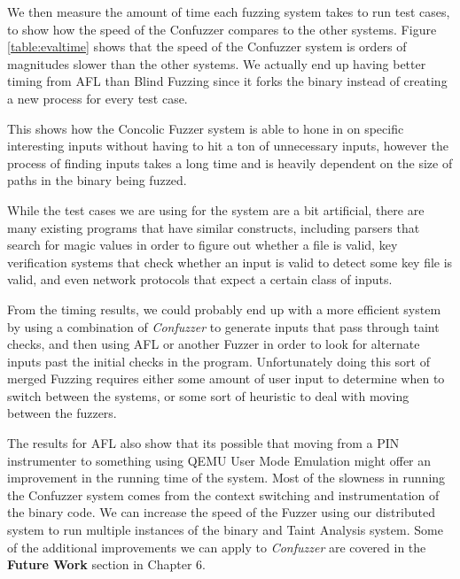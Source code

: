 We then measure the amount of time each fuzzing system takes to run test cases,
to show how the speed of the Confuzzer compares to the other systems. Figure
\ref{table:evaltime} shows that the speed of the Confuzzer system is orders of
magnitudes slower than the other systems. We actually end up having better
timing from AFL than Blind Fuzzing since it forks the binary instead of creating
a new process for every test case.

This shows how the Concolic Fuzzer system is able to hone in on specific
interesting inputs without having to hit a ton of unnecessary inputs, however
the process of finding inputs takes a long time and is heavily dependent on the
size of paths in the binary being fuzzed.

While the test cases we are using for the system are a bit artificial, there are
many existing programs that have similar constructs, including parsers that
search for magic values in order to figure out whether a file is valid, key
verification systems that check whether an input is valid to detect some key
file is valid, and even network protocols that expect a certain class of inputs.

From the timing results, we could probably end up with a more efficient system
by using a combination of \textit{Confuzzer} to generate inputs that pass
through taint checks, and then using AFL or another Fuzzer in order to look for
alternate inputs past the initial checks in the program. Unfortunately doing
this sort of merged Fuzzing requires either some amount of user input to
determine when to switch between the systems, or some sort of heuristic to deal
with moving between the fuzzers.

The results for AFL also show that its possible that moving from a PIN
instrumenter to something using QEMU User Mode Emulation might offer an
improvement in the running time of the system. Most of the slowness in running
the Confuzzer system comes from the context switching and instrumentation of the
binary code. We can increase the speed of the Fuzzer using our distributed
system to run multiple instances of the binary and Taint Analysis system. Some
of the additional improvements we can apply to \textit{Confuzzer} are covered in
the \textbf{Future Work} section in Chapter 6.

